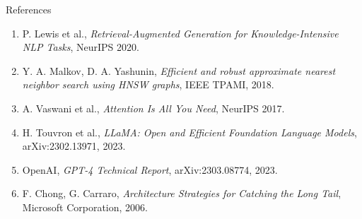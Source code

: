 \documentclass{beamer}
\begin{document}
\begin{frame}{References}

\begin{enumerate}
    \item P. Lewis et al., \textit{Retrieval-Augmented Generation for Knowledge-Intensive NLP Tasks}, NeurIPS 2020.
    
    \item Y. A. Malkov, D. A. Yashunin, \textit{Efficient and robust approximate nearest neighbor search using HNSW graphs}, IEEE TPAMI, 2018.
    
    \item A. Vaswani et al., \textit{Attention Is All You Need}, NeurIPS 2017.
    
    \item H. Touvron et al., \textit{LLaMA: Open and Efficient Foundation Language Models}, arXiv:2302.13971, 2023.
    
    \item OpenAI, \textit{GPT-4 Technical Report}, arXiv:2303.08774, 2023.
    
    \item F. Chong, G. Carraro, \textit{Architecture Strategies for Catching the Long Tail}, Microsoft Corporation, 2006.
\end{enumerate}

\end{frame}
\end{document}
